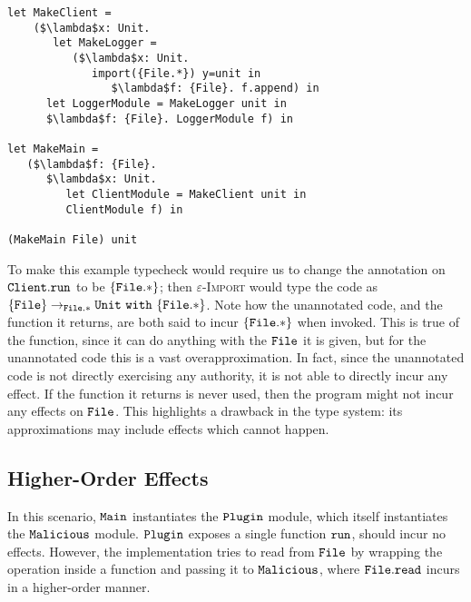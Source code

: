 \begin{lstlisting}
let MakeClient =
	($\lambda$x: Unit.
	   let MakeLogger =
	      ($\lambda$x: Unit.
	         import({File.*}) y=unit in
	            $\lambda$f: {File}. f.append) in
      let LoggerModule = MakeLogger unit in
      $\lambda$f: {File}. LoggerModule f) in

let MakeMain =
   ($\lambda$f: {File}.
      $\lambda$x: Unit.
         let ClientModule = MakeClient unit in
         ClientModule f) in

(MakeMain File) unit
\end{lstlisting}

To make this example typecheck would require us to change the annotation on $\mathtt{Client.run}$ to be $\mathtt{ \{ File.* \}}$; then \textsc{$\varepsilon$-Import} would type the code as $\mathtt{ \{ File \} \rightarrow_{\mathtt{File.*}}  \mathtt{Unit} ~\mathtt{with}~ \{ File.* \}}$. Note how the unannotated code, and the function it returns, are both said to incur $\{ \mathtt{File.*} \}$ when invoked. This is true of the function, since it can do anything with the $\mathtt{File}$ it is given, but for the unannotated code this is a vast overapproximation. In fact, since the unannotated code is not directly exercising any authority, it is not able to directly incur any effect. If the function it returns is never used, then the program might not incur any effects on $\mathtt{File}$. This highlights a drawback in the type system: its approximations may include effects which cannot happen.































\subsection{Higher-Order Effects}

In this scenario, $\mathtt{Main}$ instantiates the $\mathtt{Plugin}$ module, which itself instantiates the $\mathtt{Malicious}$ module. $\mathtt{Plugin}$ exposes a single function $\mathtt{run}$, should incur no effects. However, the implementation tries to read from $\mathtt{File}$ by wrapping the operation inside a function and passing it to $\mathtt{Malicious}$, where $\mathtt{File.read}$ incurs in a higher-order manner.

